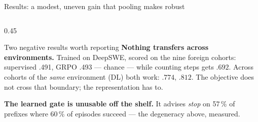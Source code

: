 \documentclass[10pt, aspectratio=169]{beamer}
\newcommand{\bad}[1]{\textcolor{warn}{#1}}
\begin{document}
\begin{frame}{Results: a modest, uneven gain that pooling makes robust}
\begin{columns}[t]
\begin{column}{0.45\textwidth}
\medskip
\begin{block}{Two negative results worth reporting}
\textbf{Nothing transfers across environments.} Trained on DeepSWE, scored on
the nine foreign cohorts: supervised \bad{.491}, GRPO \bad{.493} --- chance ---
while counting steps gets $.692$. Across cohorts of the \emph{same} environment
(DL) both work: $.774$, $.812$. The objective does not cross that boundary; the
representation has to.

\medskip
\textbf{The learned gate is unusable off the shelf.} It advises \emph{stop} on
57\,\% of prefixes where 60\,\% of episodes succeed --- the degeneracy above,
measured.
\end{block}
\end{column}
\end{columns}
\end{frame}
\end{document}
